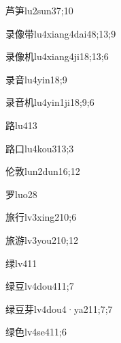 \begin{verbete}{芦笋}{lu2sun3}{7;10}
\end{verbete}

\begin{verbete}{录像带}{lu4xiang4dai4}{8;13;9}
\end{verbete}

\begin{verbete}{录像机}{lu4xiang4ji1}{8;13;6}
\end{verbete}

\begin{verbete}{录音}{lu4yin1}{8;9}
\end{verbete}

\begin{verbete}{录音机}{lu4yin1ji1}{8;9;6}
\end{verbete}

\begin{verbete}{路}{lu4}{13}
\end{verbete}

\begin{verbete}{路口}{lu4kou3}{13;3}
\end{verbete}

\begin{verbete}{伦敦}{lun2dun1}{6;12}
\end{verbete}

\begin{verbete}{罗}{luo2}{8}
\end{verbete}

\begin{verbete}{旅行}{lv3xing2}{10;6}
\end{verbete}

\begin{verbete}{旅游}{lv3you2}{10;12}
\end{verbete}

\begin{verbete}{绿}{lv4}{11}
\end{verbete}

\begin{verbete}{绿豆}{lv4dou4}{11;7}
\end{verbete}

\begin{verbete}{绿豆芽}{lv4dou4·ya2}{11;7;7}
\end{verbete}

\begin{verbete}{绿色}{lv4se4}{11;6}
\end{verbete}

